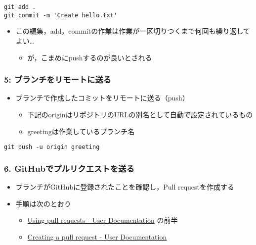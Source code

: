 \documentclass[a4paper,twoside,twocolumn]{bxjsarticle}
\begin{document}
\begin{verbatim}
git add .
git commit -m 'Create hello.txt'
\end{verbatim}

\begin{itemize}
\item この編集，add，commitの作業は作業が一区切りつくまで何回も繰り返してよい…
\begin{itemize}
\item が，こまめにpushするのが良いとされる
\end{itemize}
\end{itemize}

\subsubsection{5: ブランチをリモートに送る}
\label{sec-2-3-6}
\begin{itemize}
\item ブランチで作成したコミットをリモートに送る（push）
\begin{itemize}
\item 下記のoriginはリポジトリのURLの別名として自動で設定されているもの
\item greetingは作業しているブランチ名
\end{itemize}
\end{itemize}

\begin{verbatim}
git push -u origin greeting
\end{verbatim}

\subsubsection{6. GitHubでプルリクエストを送る}
\label{sec-2-3-7}
\begin{itemize}
\item ブランチがGitHubに登録されたことを確認し，Pull requestを作成する
\item 手順は次のとおり
\begin{itemize}
\item \href{https://help.github.com/articles/using-pull-requests/}{Using pull requests - User Documentation} の前半
\item \href{https://help.github.com/articles/creating-a-pull-request/}{Creating a pull request - User Documentation}
\end{itemize}
\end{itemize}
\end{document}

